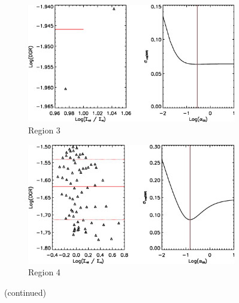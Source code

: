 \begin{figure}  
  \ContinuedFloat
  \begin{subfigure}[t]{1\textwidth}
    \centering
    \includegraphics[width=1.\textwidth]{dgr_imgs/region_3_aco_output_10f.eps}
    \caption{Region 3}
    \label{fig:dgr_co10_3}
  \end{subfigure}

  \begin{subfigure}[t]{1\textwidth}
    \centering
    \includegraphics[width=1.\textwidth]{dgr_imgs/region_4_aco_output_10f.eps}
    \caption{Region 4}
  \end{subfigure}
   \caption{(continued)}
   \label{fig:dgr_co10}
\end{figure}

